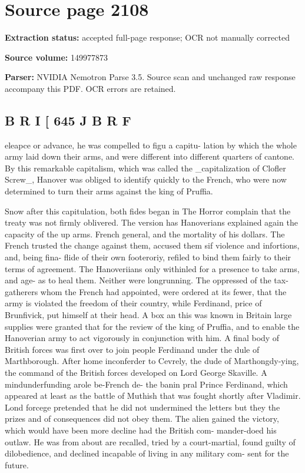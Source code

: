 \clearpage
\section{Source page 2108}
\textbf{Extraction status:} accepted full-page response; OCR not manually corrected\par
\textbf{Source volume:} 149977873\par
\textbf{Parser:} NVIDIA Nemotron Parse 3.5. Source scan and unchanged raw response accompany this PDF. OCR errors are retained.\par\medskip
\subsection*{B R I  [ 645 J B R F}
eleapce or advance, he was compelled to figu a capitu- lation by which the whole army laid down their arms, and were different into different quarters of cantone. By this remarkable capitalism, which was called the \_capitalization of Clofler Screw\_, Hanover was obliged to identify quickly to the French, who were now determined to turn their arms against the king of Pruffia.\par\medskip
Snow after this capitulation, both fides began in The Horror complain that the treaty was not firmly oblivered. The version has Hanoverians explained again the capacity of the up arms. French general, and the mortality of his dollars. The French trusted the change against them, accused them sif violence and infortions, and, being fina- flide of their own footeroriy, refiled to bind them fairly to their terms of agreement. The Hanoveriians only withinled for a presence to take arms, and age- as to heal them. Neither were longrunning. The oppressed of the tax-gatherers whom the French had appointed, were ordered at its fewer, that the army is violated the freedom of their country, while Ferdinand, price of Brunfivick, put himself at their head. A box an this was known in Britain large supplies were granted that for the review of the king of Pruffia, and to enable the Hanoverian army to act vigorously in conjunction with him. A final body of British forces was first over to join people Ferdinand under the dule of Marthborough. After home inconferder to Cevrely, the dude of Marthongdy-ying, the command of the British forces developed on Lord George Skaville. A mindunderfunding arole be-French de- the banin pral Prince Ferdinand, which appeared at least as the battle of Muthish that was fought shortly after Vladimir. Lond forcege pretended that he did not undermined the letters but they the prizes and of consequences did not obey them. The alien gained the victory, which would have been more decline had the British com- mander-doed his outlaw. He was from about are recalled, tried by a court-martial, found guilty of dilobedience, and declined incapable of living in any military com- sent for the future.\par\medskip
